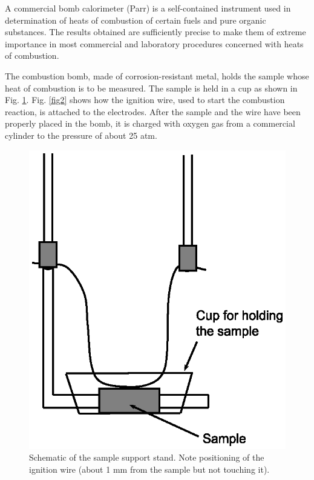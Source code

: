 \documentclass[byrevtex,amssymb,aps,pra,floatfix,letterpaper]{revtex4}
\begin{document}
A commercial bomb calorimeter (Parr) is a self-contained instrument used in determination of heats of combustion of certain fuels and pure organic substances. The results obtained are sufficiently precise to make them of extreme importance in most commercial and laboratory procedures concerned with heats of combustion.

The combustion bomb, made of corrosion-resistant metal, holds the sample whose heat of combustion is to be measured. The sample is held in a cup as shown in Fig. \ref{fig1}. Fig. \ref{fig2} shows how the ignition wire, used to start the combustion reaction, is attached to the electrodes. After the sample and the wire have been properly placed in the bomb, it is charged with oxygen gas from a commercial cylinder to the pressure of about 25 atm.

\begin{figure}[!htp]
\begin{center}
\includegraphics[scale=0.5]{calorimeter}
\caption{Schematic of the sample support stand. Note positioning of the ignition wire (about 1 mm from the sample but not touching it).}
\label{fig1}
\end{center}
\end{figure}
\end{document}
